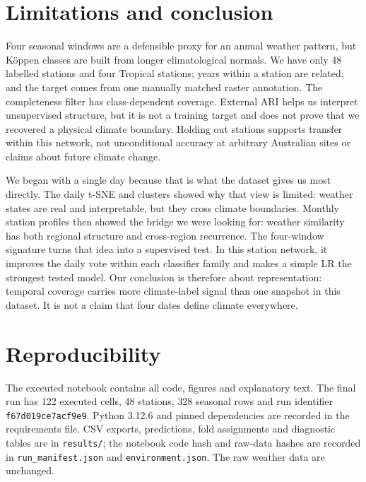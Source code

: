 \documentclass{article}
\newcommand{\SeasonRows}{328}
\newcommand{\PythonVersion}{3.12.6}
\newcommand{\RunID}{f67d019ce7acf9e9}
\begin{document}
\section{Limitations and conclusion}
Four seasonal windows are a defensible proxy for an annual weather pattern, but Köppen classes are built from longer climatological normals. We have only 48 labelled stations and four Tropical stations; years within a station are related; and the target comes from one manually matched raster annotation. The completeness filter has class-dependent coverage. External ARI helps us interpret unsupervised structure, but it is not a training target and does not prove that we recovered a physical climate boundary. Holding out stations supports transfer within this network, not unconditional accuracy at arbitrary Australian sites or claims about future climate change.

We began with a single day because that is what the dataset gives us most directly. The daily t-SNE and clusters showed why that view is limited: weather states are real and interpretable, but they cross climate boundaries. Monthly station profiles then showed the bridge we were looking for: weather similarity has both regional structure and cross-region recurrence. The four-window signature turns that idea into a supervised test. In this station network, it improves the daily vote within each classifier family and makes a simple LR the strongest tested model. Our conclusion is therefore about representation: temporal coverage carries more climate-label signal than one snapshot in this dataset. It is not a claim that four dates define climate everywhere.

\section*{Reproducibility}
The executed notebook contains all code, figures and explanatory text. The final run has 122 executed cells, 48 stations, \SeasonRows{} seasonal rows and run identifier \texttt{\RunID}. Python \PythonVersion{} and pinned dependencies are recorded in the requirements file. CSV exports, predictions, fold assignments and diagnostic tables are in \texttt{results/}; the notebook code hash and raw-data hashes are recorded in \texttt{run\_manifest.json} and \texttt{environment.json}. The raw weather data are unchanged.
\end{document}
